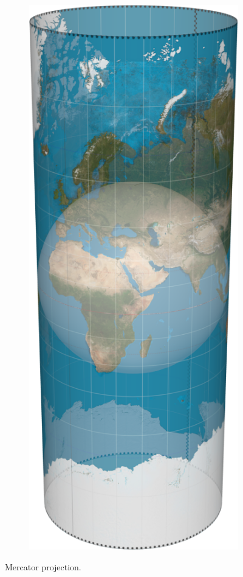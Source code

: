 \begin{figure}[htbp]
\begin{subfigure}[bt]{0.15\textwidth}
        \includegraphics[width=\textwidth]{figures/map_projection/projection_mercator.png}
    \end{subfigure}
    \caption{Mercator projection.}
    \label{fig:proj_mercator}
\end{figure}

